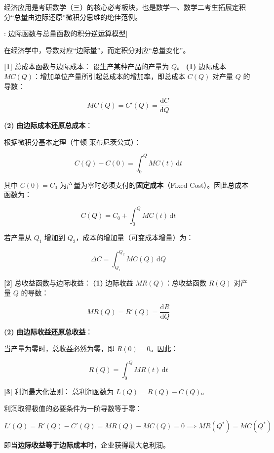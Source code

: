 \documentclass[11pt,a4paper,UTF8]{ctexart}
\begin{document}
经济应用是考研数学（三）的核心必考板块，也是数学一、数学二考生拓展定积分“总量由边际还原”微积分思维的绝佳范例。

\begin{thmbox}[模型[6]: 边际函数与总量函数的积分逆运算模型]

在经济学中，导数对应“边际量”，而定积分对应“总量变化”。

\textbf{[1]} 总成本函数与边际成本：
设生产某种产品的产量为 $Q$。
\textbf{(1)}  \textit{}边际成本 $MC(Q)$\textit{}：增加单位产量所引起总成本的增加率，即总成本 $C(Q)$ 对产量 $Q$ 的导数：


\begin{equation*}
MC(Q) = C'(Q) = \frac{\mathrm{d}C}{\mathrm{d}Q}
\end{equation*}


\textbf{(2)}  \textbf{由边际成本还原总成本}：

根据微积分基本定理（牛顿-莱布尼茨公式）：


\begin{equation*}
C(Q) - C(0) = \int_0^Q MC(t)\,\mathrm{d}t
\end{equation*}


其中 $C(0) = C_0$ 为产量为零时必须支付的\textbf{固定成本}（Fixed Cost）。因此总成本函数为：


\begin{equation*}
C(Q) = C_0 + \int_0^Q MC(t)\,\mathrm{d}t
\end{equation*}


若产量从 $Q_1$ 增加到 $Q_2$，成本的增加量（可变成本增量）为：


\begin{equation*}
\Delta C = \int_{Q_1}^{Q_2} MC(Q)\,\mathrm{d}Q
\end{equation*}


\textbf{[2]} 总收益函数与边际收益：
\textbf{(1)}  \textit{}边际收益 $MR(Q)$\textit{}：总收益函数 $R(Q)$ 对产量 $Q$ 的导数：


\begin{equation*}
MR(Q) = R'(Q) = \frac{\mathrm{d}R}{\mathrm{d}Q}
\end{equation*}


\textbf{(2)}  \textbf{由边际收益还原总收益}：

当产量为零时，总收益必然为零，即 $R(0) = 0$。因此：


\begin{equation*}
R(Q) = \int_0^Q MR(t)\,\mathrm{d}t
\end{equation*}


\textbf{[3]} 利润最大化法则：
总利润函数为 $L(Q) = R(Q) - C(Q)$。

利润取得极值的必要条件为一阶导数等于零：


\begin{equation*}
L'(Q) = R'(Q) - C'(Q) = MR(Q) - MC(Q) = 0 \implies MR(Q^*) = MC(Q^*)
\end{equation*}


即当\textbf{边际收益等于边际成本}时，企业获得最大总利润。

\end{thmbox}
\end{document}
